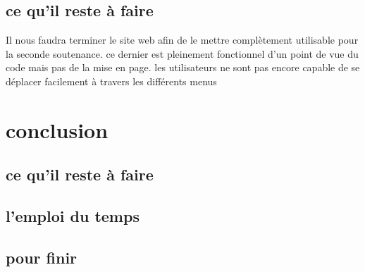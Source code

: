 \documentclass{report}
\begin{document}
\section{ce qu'il reste à faire}
Il nous faudra terminer le site web afin de le mettre complètement utilisable pour la seconde soutenance. ce dernier est pleinement fonctionnel d'un point de vue du code mais pas de la mise en page. les utilisateurs ne sont pas encore capable de se déplacer facilement à travers les différents menus
\chapter{conclusion}
\section{ce qu'il reste à faire}
\section{l'emploi du temps}
\section{pour finir}


\end{document}
